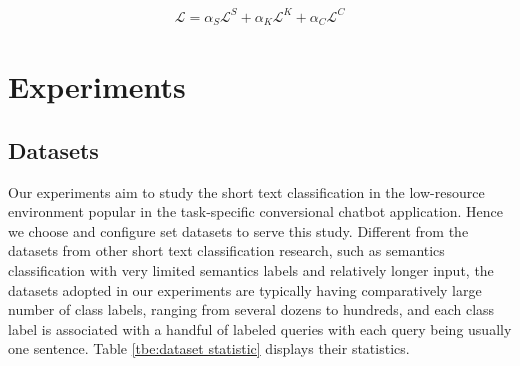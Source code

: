 \documentclass[letterpaper]{article} %
\begin{document}
  \begin{align}
    \mathcal{L} = \alpha_S \mathcal{L}^S + \alpha_K \mathcal{L}^K + \alpha_C \mathcal{L}^C
    \label{eq:joint_SFC_loss}
  \end{align}

  \section{Experiments}
  \label{sec:exp}

  \subsection{Datasets}
  Our experiments aim to study the short text classification in the low-resource
  environment  popular  in  the  task-specific conversional chatbot application.
  Hence we choose and configure set datasets to serve this study. Different from
  the  datasets from other short text classification research, such as semantics
  classification  with  very  limited  semantics labels and relatively longer
  input,   the   datasets  adopted  in  our  experiments  are  typically  having
  comparatively  large  number  of  class labels, ranging from several dozens to
  hundreds,  and  each  class  label  is  associated  with  a handful of labeled
  queries with each  query  being usually  one  sentence. Table \ref{tbe:dataset
  statistic} displays their statistics.
\end{document}
